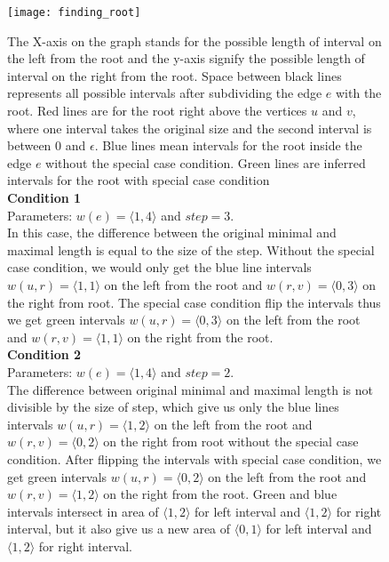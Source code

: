 \begin{figure}[ht!]
	\centering
	\label{finding_root}
  	\texttt{[image: finding\_root]}
  	\caption[Rooting the gene tree: special case condition]
  	{The X-axis on the graph stands for the possible length of interval on the left from the root and the y-axis signify the possible length of interval on the right from the root. Space between black lines represents all possible intervals after subdividing the edge $e$ with the root. Red lines are for the root right above the vertices $u$ and $v$, where one interval takes the original size and the second interval is between $0$ and $\epsilon$. Blue lines mean intervals for the root inside the edge $e$ without the special case condition. Green lines are inferred intervals for the root with special case condition \\
  	\textbf{Condition 1}\\
  	Parameters: $w(e) = \langle 1, 4 \rangle$ and $step = 3$. \\
  	In this case, the difference between the original minimal and maximal length is equal to the size of the step. Without the special case condition, we would only get the blue line intervals $w(u, r) = \langle 1, 1 \rangle$ on the left from the root and $w(r, v) = \langle 0, 3 \rangle$ on the right from root. The special case condition flip the intervals thus we get green intervals $w(u, r) = \langle 0, 3 \rangle$ on the left from the root and $w(r, v) = \langle 1, 1 \rangle$ on the right from the root.\\
  	\textbf{Condition 2}\\
  	Parameters: $w(e) = \langle 1, 4 \rangle$ and $step = 2$. \\
  	The difference between original minimal and maximal length is not divisible by the size of step, which give us only the blue lines intervals $w(u, r) = \langle 1, 2 \rangle$ on the left from the root and $w(r, v) = \langle 0, 2 \rangle$ on the right from root without the special case condition. After flipping the intervals with special case condition, we get green intervals $w(u, r) = \langle 0, 2 \rangle$ on the left from the root and $w(r, v) = \langle 1, 2 \rangle$ on the right from the root. Green and blue intervals intersect in area of $\langle 1, 2 \rangle$ for left interval and $\langle 1, 2 \rangle$ for right interval, but it also give us a new area of $\langle 0, 1 \rangle$ for left interval and $\langle 1, 2 \rangle$ for right interval.}
\end{figure}

